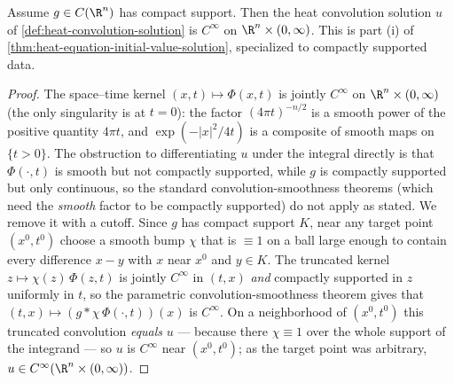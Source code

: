 \begin{lemma}
\label{lem:heat-convolution-smooth}
\leanok
Assume $g \in C(\R^n)$ has compact support. Then the heat convolution solution $u$ of
\cref{def:heat-convolution-solution} is $C^\infty$ on $\R^n \times (0,\infty)$. This is
part (i) of \cref{thm:heat-equation-initial-value-solution}, specialized to compactly
supported data.
\end{lemma}
\begin{proof}
\leanok
The space--time kernel $(x,t)\mapsto\Phi(x,t)$ is jointly $C^\infty$ on
$\R^n\times(0,\infty)$ (the only singularity is at $t=0$): the factor $(4\pi t)^{-n/2}$
is a smooth power of the positive quantity $4\pi t$, and $\exp(-|x|^2/4t)$ is a composite
of smooth maps on $\{t>0\}$. The obstruction to differentiating $u$ under the integral
directly is that $\Phi(\cdot,t)$ is smooth but not compactly supported, while $g$ is
compactly supported but only continuous, so the standard convolution-smoothness theorems
(which need the \emph{smooth} factor to be compactly supported) do not apply as stated.
We remove it with a cutoff. Since $g$ has compact support $K$, near any target point
$(x^0,t^0)$ choose a smooth bump $\chi$ that is $\equiv 1$ on a ball large enough to
contain every difference $x-y$ with $x$ near $x^0$ and $y\in K$. The truncated kernel
$z\mapsto\chi(z)\,\Phi(z,t)$ is jointly $C^\infty$ in $(t,x)$ \emph{and} compactly
supported in $z$ uniformly in $t$, so the parametric convolution-smoothness theorem gives
that $(t,x)\mapsto (g \ast \chi\,\Phi(\cdot,t))(x)$ is $C^\infty$. On a neighborhood of
$(x^0,t^0)$ this truncated convolution \emph{equals} $u$ — because there $\chi\equiv 1$
over the whole support of the integrand — so $u$ is $C^\infty$ near $(x^0,t^0)$; as the
target point was arbitrary, $u\in C^\infty(\R^n\times(0,\infty))$.
\end{proof}

